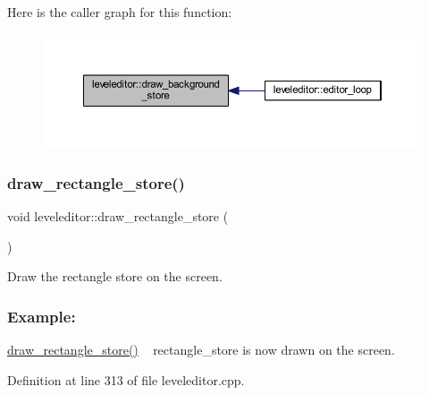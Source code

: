 Here is the caller graph for this function\+:
\nopagebreak
\begin{figure}[H]
\begin{center}
\leavevmode
\includegraphics[width=350pt]{classleveleditor_afa6c25fa02db7ad3d904d6bb91b79643_icgraph}
\end{center}
\end{figure}
\mbox{\label{classleveleditor_ae819c7275982ef9e2891017985560c6d}} 
\subsubsection{\texorpdfstring{draw\+\_\+rectangle\+\_\+store()}{draw\_rectangle\_store()}}
{\footnotesize\ttfamily void leveleditor\+::draw\+\_\+rectangle\+\_\+store (\begin{DoxyParamCaption}{ }\end{DoxyParamCaption})}



Draw the rectangle store on the screen. 

\subsubsection*{Example\+: }

\hyperlink{classleveleditor_ae819c7275982ef9e2891017985560c6d}{draw\+\_\+rectangle\+\_\+store()} ~\newline
rectangle\+\_\+store is now drawn on the screen. ~\newline


Definition at line 313 of file leveleditor.\+cpp.

